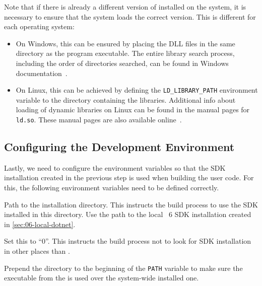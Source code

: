 Note that if there is already a different version of \libopenssl{} installed on the system, it is
necessary to ensure that the system loads the correct \libopenssl{} version. This is different for
each operating system:

\begin{itemize}

  \item On Windows, this can be ensured by placing the DLL files in the same directory as the
program executable. The entire library search process, including the order of directories searched,
can be found in Windows documentation~\cite{windowsDllSearch}.

  \item On Linux, this can be achieved by defining the \texttt{LD_LIBRARY_PATH} environment variable
to the directory containing the \libopenssl{} libraries. Additional info about loading of dynamic
libraries on Linux can be found in the manual pages for \texttt{ld.so}. These manual pages are also
available online~\cite{linuxDllSearch}.

\end{itemize}

\subsection{Configuring the Development Environment}\label{sec:06-env-vars}

Lastly, we need to configure the environment variables so that the \dotnet{} SDK installation
created in the previous step is used when building the user code. For this, the following
environment variables need to be defined correctly.

\begin{description}

         Path to the \dotnet{} installation directory. This instructs
the build process to use the SDK installed in this directory. Use the path to the local \dotnet{}~6
SDK installation created in \autoref{sec:06-local-dotnet}.

         Set this to ``0''. This instructs the build
process not to look for SDK installation in other places than .

         Prepend the  directory to the beginning of the
\texttt{PATH} variable to make sure the  executable from the 
is used over the system-wide installed one.
\end{description}

